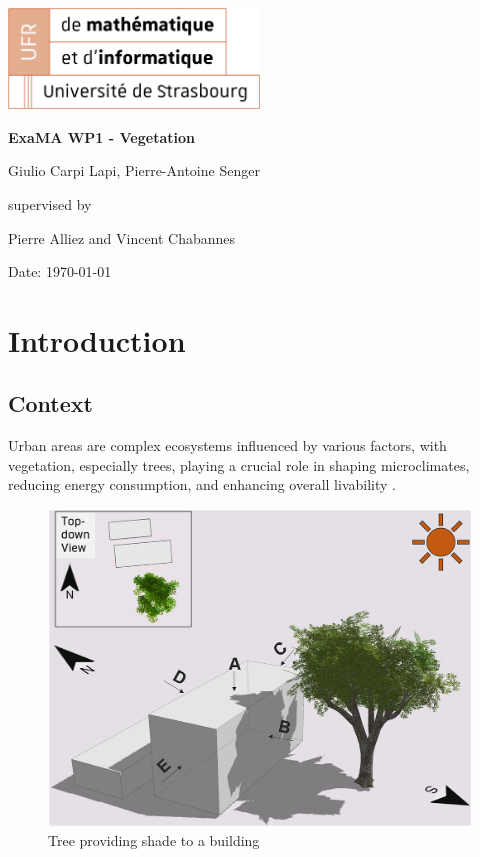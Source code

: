 \documentclass[12pt]{article}
\begin{document}
\begin{titlepage}
\centering
\includegraphics[width=0.5\textwidth]{images/logo_ufr.png}\par\vspace{1cm}
\vspace{1.5cm}
{\huge\bfseries ExaMA WP1 - Vegetation\par}
\vspace{2cm}
{\Large Giulio Carpi Lapi, Pierre-Antoine Senger\par}
\vfill
supervised by\par
Pierre Alliez and Vincent Chabannes

\vfill

{\large Date: \today\par}
\end{titlepage}

\tableofcontents
\newpage

\section{Introduction}

\subsection{Context}

Urban areas are complex ecosystems influenced by various factors, with
vegetation, especially trees, playing a crucial role in shaping microclimates,
reducing energy consumption, and enhancing overall livability \cite{TIR4sTREEt}.

\begin{figure}[H]
    \centering
    \includegraphics[width=1\textwidth]{images/TreeShade.png}
    \caption{Tree providing shade to a building \cite{img:TreeShade}}
\end{figure}
\end{document}
